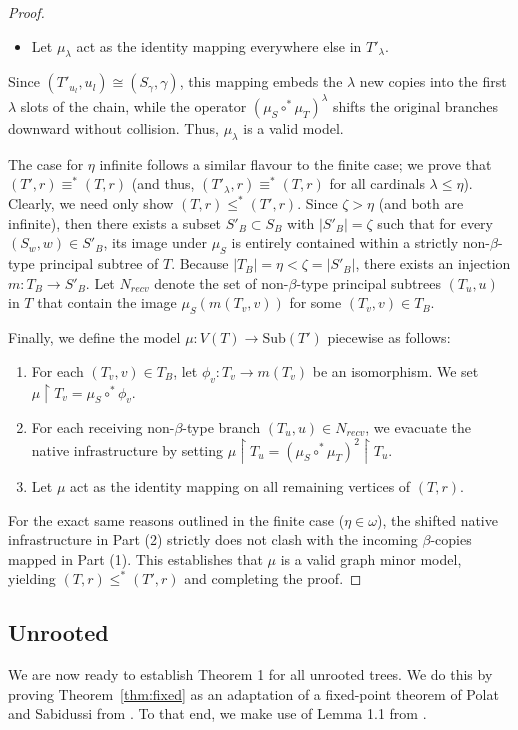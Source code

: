 \documentclass[12pt]{amsart}
\numberwithin{mytheorem}{section} %
\numberwithin{mylemma}{section} %
\numberwithin{mycorollary}{section} %
\begin{document}
\begin{proof}
\begin{itemize}
\item Let $\mu_\lambda$ act as the identity mapping everywhere else in $T'_\lambda$.
\end{itemize}

\noindent
Since $(T'_{u_l}, u_l) \cong (S_\gamma, \gamma)$, this mapping embeds the $\lambda$ new copies into the first $\lambda$ slots of the chain, while the operator $(\mu_S \circ^* \mu_T)^\lambda$ shifts the original branches downward without collision. Thus, $\mu_\lambda$ is a valid model.


The case for $\eta$ infinite follows a similar flavour to the finite case; we prove that $(T', r) \equiv^* (T,r)$ (and thus, $(T'_\lambda, r) \equiv^* (T,r)$ for all cardinals $\lambda \leq \eta$). Clearly, we need only show $(T, r) \leq^* (T',r)$. Since $\zeta > \eta$ (and both are infinite), then there exists a subset $S'_B \subset S_B$ with $|S'_B| = \zeta$ such that for every $(S_w, w) \in S'_B$, its image under $\mu_S$ is entirely contained within a strictly non-$\beta$-type principal subtree of $T$. Because $|T_B| = \eta < \zeta = |S'_B|$, there exists an injection $m: T_B \to S'_B$. Let $N_{recv}$ denote the set of non-$\beta$-type principal subtrees $(T_u, u)$ in $T$ that contain the image $\mu_S(m(T_v, v))$ for some $(T_v, v) \in T_B$. 

Finally, we define the model $\mu: V(T) \to \text{Sub}(T')$ piecewise as follows:
\begin{enumerate}
\item For each $(T_v, v) \in T_B$, let $\phi_v: T_v \to m(T_v)$ be an isomorphism. We set $\mu \restriction T_v = \mu_S \circ^* \phi_v$.
\item For each receiving non-$\beta$-type branch $(T_u, u) \in N_{recv}$, we evacuate the native infrastructure by setting $\mu \restriction T_u = (\mu_S \circ^* \mu_T)^2 \restriction T_u$.
\item Let $\mu$ act as the identity mapping on all remaining vertices of $(T, r)$.
\end{enumerate}

For the exact same reasons outlined in the finite case ($\eta \in \omega$), the shifted native infrastructure in Part (2) strictly does not clash with the incoming $\beta$-copies mapped in Part (1). This establishes that $\mu$ is a valid graph minor model, yielding $(T, r) \leq^* (T', r)$ and completing the proof.

\end{proof}
\subsection{Unrooted}\label{sec:unrootedSmall}
We are now ready to establish Theorem 1 for all unrooted trees. We do this by proving Theorem~\ref{thm:fixed} as an adaptation of a fixed-point theorem of Polat and Sabidussi from \cite{P}. To that end, we make use of Lemma 1.1 from \cite{P}.
\end{document}
